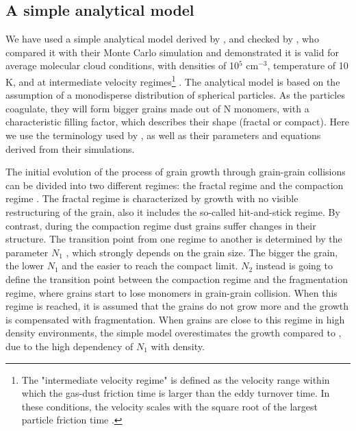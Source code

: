 \documentclass{aa}
\begin{document}
\subsection{A simple analytical model}

We have used a simple analytical model derived by , and checked by , who compared it with their Monte Carlo simulation and demonstrated it is valid for average molecular cloud conditions, with densities of 10$^5$ cm$^{-3}$, temperature of 10 K, and at intermediate velocity regimes\footnote{The "intermediate velocity regime" is defined as the velocity range within which the gas-dust friction time is larger than the eddy turnover time.  In these conditions, the velocity scales with the square root of the largest particle friction time .}  . The analytical model is based on the assumption of a monodisperse distribution of spherical particles. As the particles coagulate, they will form bigger grains made out of N monomers, with a characteristic filling factor, which describes their shape (fractal or compact). Here we use the terminology used by , as well as their parameters and equations derived from their simulations. 

The initial evolution of the process of grain growth through grain-grain collisions can be divided into two different regimes: the fractal regime and the compaction regime . The fractal regime is characterized by growth with no visible restructuring of the grain, also it includes the so-called hit-and-stick regime. By contrast, during the compaction regime dust grains suffer changes in their structure. The transition point from one regime to another is determined by the parameter $N_1$ \citep[see Appendix A from]{2009A&A...502..845O}, which strongly depends on the grain size. The bigger the grain, the lower $N_1$ and the easier to reach the compact limit. $N_2$ \citep[see Appendix A from]{2009A&A...502..845O} instead is going to define the transition point between the compaction regime and the fragmentation regime, where grains start to lose monomers in grain-grain collision. When this regime is reached, it is assumed that the grains do not grow more and the growth is compensated with fragmentation.
When grains are close to this regime in high density environments, the simple model overestimates the growth compared to , due to the high dependency of $N_1$ with density.
\end{document}
